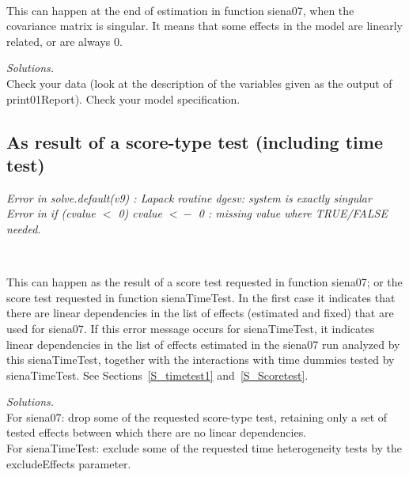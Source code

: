 \documentclass[a4paper,fleqn,11pt]{article}
\newcommand{\+}{\, + \,}
\newcommand{\sfn}[1]{\textsf{#1}}
\begin{document}
{\begin{minipage}{0.05\textwidth}
$\phantom{abcde}$

\end{minipage}
\begin{minipage}{0.94\textwidth}
This can happen at the end of estimation in function \sfn{siena07},
when the covariance matrix is singular.
It means that some effects in the model are linearly related,
or are always 0.
\smallskip

\noindent
\emph{Solutions.}\\
Check your data (look at the description of the variables
given as the output of \sfn{print01Report}).
Check your model specification.
\end{minipage}


\subsection{As result of a score-type test (including time test)}

\emph{Error in solve.default(v9) :
   Lapack routine dgesv: system is exactly singular\\
Error in if (cvalue $<$ 0) cvalue $<\!\!-$ 0 :
   missing value where TRUE/FALSE needed.}
\smallskip

\begin{minipage}{0.05\textwidth}
$\phantom{abcde}$

\end{minipage}
\begin{minipage}{0.94\textwidth}
This can happen as the result of a score test requested in function
\sfn{siena07}; or the score test requested in function
\sfn{sienaTimeTest}.
In the first case it indicates that there are linear dependencies in the
list of effects (estimated and fixed)
that are used for \sfn{siena07}.
If this error message occurs for \sfn{sienaTimeTest}, it indicates
linear dependencies in the list of effects estimated
in the \sfn{siena07} run analyzed by this \sfn{sienaTimeTest},
together with the interactions with time dummies tested by
\sfn{sienaTimeTest}.
See Sections~\ref{S_timetest1} and~\ref{S_Scoretest}.
\smallskip

\noindent
\emph{Solutions.} \\
For \sfn{siena07}: drop some of the requested score-type test,
retaining only a set of tested effects between which there are no
linear dependencies.\\
For \sfn{sienaTimeTest}: exclude some of the requested
time heterogeneity tests by the \sfn{excludeEffects} parameter.
\end{minipage}

}
\end{document}
